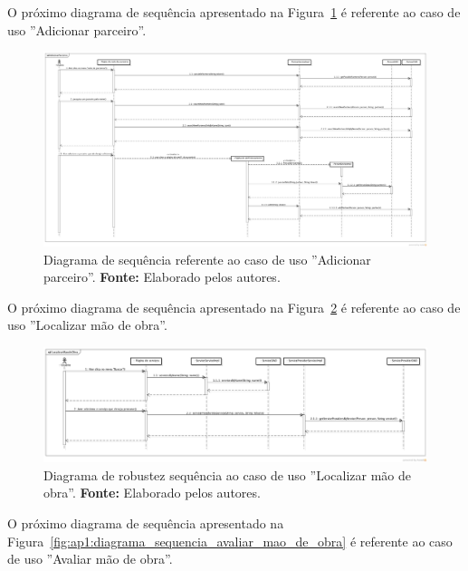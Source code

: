 O próximo diagrama de sequência apresentado na Figura~\ref{fig:ap1:diagrama_sequencia_adicionar_parceiro} é referente ao caso de uso ''Adicionar parceiro''.

\captionsetup[figure]{list=no}
\begin{figure}[h!]
	\centerline{\includegraphics[angle=90,scale=0.25]{./imagens/apendices/diagrama-sequencia-adicionar-parceiros.png}}
	\caption[Diagrama de sequência referente ao caso de uso ''Adicionar parceiro''.]
	{Diagrama de sequência referente ao caso de uso ''Adicionar parceiro''. \textbf{Fonte:} Elaborado pelos autores.}
	\label{fig:ap1:diagrama_sequencia_adicionar_parceiro}
\end{figure}

O próximo diagrama de sequência apresentado na Figura~\ref{fig:ap1:diagrama_sequencia_localizar_mao_de_obra} é referente ao caso de uso ''Localizar mão de obra''.

\captionsetup[figure]{list=no}
\begin{figure}[h!]
	\centerline{\includegraphics[angle=90,scale=0.35]{./imagens/apendices/diagrama-sequencia-localizar-mao-de-obra.png}}
	\caption[Diagrama de sequência referente ao caso de uso ''Localizar mão de obra''.]
	{Diagrama de robustez sequência ao caso de uso ''Localizar mão de obra''. \textbf{Fonte:} Elaborado pelos autores.}
	\label{fig:ap1:diagrama_sequencia_localizar_mao_de_obra}
\end{figure}

O próximo diagrama de sequência apresentado na Figura~\ref{fig:ap1:diagrama_sequencia_avaliar_mao_de_obra} é referente ao caso de uso ''Avaliar mão de obra''.

